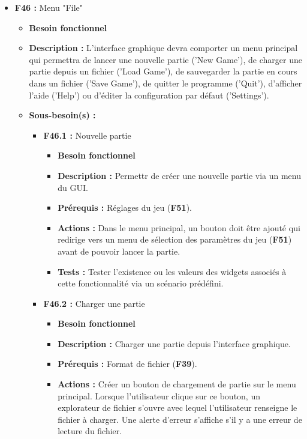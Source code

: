 \documentclass{article}
\begin{document}
\medskip
\begin{itemize}
    \item \textbf{F46 :} Menu "File"
    \begin{itemize}
        \item \textbf{Besoin fonctionnel}
        \item \textbf{Description :} L’interface graphique devra comporter un menu principal qui permettra de lancer une nouvelle partie (’New Game’), de charger une partie depuis un fichier (’Load Game’), de sauvegarder la partie en cours dans un fichier (’Save Game’), de quitter le programme (’Quit’), d’afficher l’aide (’Help’) ou d'éditer la configuration par défaut (’Settings’).
        \item \textbf{Sous-besoin(s) :}
        \begin{itemize}
            \smallskip
            \item \textbf{F46.1 :} Nouvelle partie
            \begin{itemize}
                \item \textbf{Besoin fonctionnel}
                \item \textbf{Description :} Permettr de créer une nouvelle partie via un menu du GUI.
                 \item \textbf{Prérequis :} Réglages du jeu (\textbf{F51}).
                 \item \textbf{Actions :} Dans le menu principal, un bouton doit être ajouté qui redirige vers un menu de sélection des paramètres du jeu (\textbf{F51}) avant de pouvoir lancer la partie.
                 \item \textbf{Tests :} Tester l'existence ou les valeurs des widgets associés à cette fonctionnalité via un scénario prédéfini.
            \end{itemize}
            \smallskip
            \item \textbf{F46.2 :} Charger une partie
            \begin{itemize}
                \item \textbf{Besoin fonctionnel}
                \item \textbf{Description :} Charger une partie depuis l'interface graphique.
                \item \textbf{Prérequis :} Format de fichier (\textbf{F39}).
                \item \textbf{Actions :} Créer un bouton de chargement de partie sur le menu principal. Lorsque l’utilisateur clique sur ce bouton, un explorateur de fichier s’ouvre avec lequel l’utilisateur renseigne le fichier à charger. Une alerte d’erreur s’affiche s'il y a une erreur de lecture du fichier.

\end{itemize}
\end{itemize}
\end{itemize}
\end{itemize}
\end{document}
